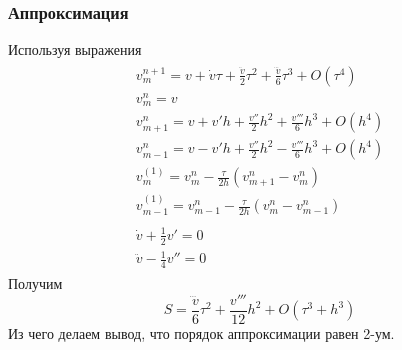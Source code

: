 \documentclass[a4paper,12pt]{article}
\begin{document}
\subsubsection{Аппроксимация}
Используя выражения
\begin{align*}
\begin{array}{l}
    v_m^{n+1}=v+\dot v \tau+\frac{\ddot v}{2} {\tau}^2+\frac{\dddot v}6{\tau}^3+O({\tau}^4)\\
    v_m^n=v\\
    v^n_{m+1}=v+v' h+\frac{v''}2 h^2+\frac{v'''}6 h^3 +O(h^4)\\
    v^n_{m-1}=v-v' h+\frac{v''}2 h^2-\frac{v'''}6 h^3 +O(h^4)\\
    v_m^{(1)}=v_m^n-\frac{\tau}{2h}(v^n_{m+1}-v^n_m)\\
    v_{m-1}^{(1)}=v_{m-1}^n-\frac{\tau}{2h}(v^n_m-v^n_{m-1})\\
    \\
    \dot v +\frac12v'=0\\
    \ddot v-\frac14v''=0
\end{array}
\end{align*}
Получим 
\[S=\frac{\dddot v}6 {\tau}^2+\frac{v'''}{12} h^2+O(\tau^3+h^3)\]
Из чего делаем вывод, что порядок аппроксимации равен 2-ум. 
\end{document}
